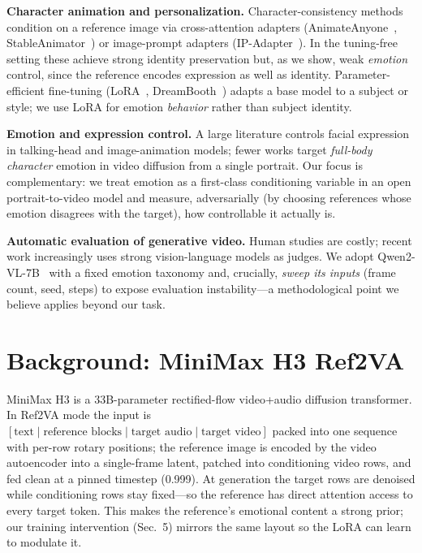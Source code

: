 \documentclass{article}
\begin{document}
\textbf{Character animation and personalization.} Character-consistency methods condition on a
reference image via cross-attention adapters (AnimateAnyone~\cite{animateanyone2023},
StableAnimator~\cite{stableanimator2024}) or image-prompt adapters
(IP-Adapter~\cite{ipadapter2023}). In the tuning-free setting these achieve strong identity
preservation but, as we show, weak \emph{emotion} control, since the reference encodes expression
as well as identity. Parameter-efficient fine-tuning (LoRA~\cite{lora2021},
DreamBooth~\cite{dreambooth2022}) adapts a base model to a subject or style; we use LoRA for
emotion \emph{behavior} rather than subject identity.

\textbf{Emotion and expression control.} A large literature controls facial expression in
talking-head and image-animation models; fewer works target \emph{full-body character} emotion in
video diffusion from a single portrait. Our focus is complementary: we treat emotion as a
first-class conditioning variable in an open portrait-to-video model and measure, adversarially
(by choosing references whose emotion disagrees with the target), how controllable it actually is.

\textbf{Automatic evaluation of generative video.} Human studies are costly; recent work
increasingly uses strong vision-language models as judges. We adopt
Qwen2-VL-7B~\cite{qwen2vl2024} with a fixed emotion taxonomy and, crucially, \emph{sweep its
inputs} (frame count, seed, steps) to expose evaluation instability---a methodological point we
believe applies beyond our task.

\section{Background: MiniMax H3 Ref2VA}
MiniMax H3 is a 33B-parameter rectified-flow video+audio diffusion transformer. In Ref2VA mode the
input is $[\text{text} \mid \text{reference blocks} \mid \text{target audio} \mid
\text{target video}]$ packed into one sequence with per-row rotary positions; the reference image
is encoded by the video autoencoder into a single-frame latent, patched into conditioning video
rows, and fed clean at a pinned timestep (0.999). At generation the target rows are denoised while
conditioning rows stay fixed---so the reference has direct attention access to every target token.
This makes the reference's emotional content a strong prior; our training intervention (Sec.~5)
mirrors the same layout so the LoRA can learn to modulate it.
\end{document}
